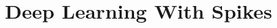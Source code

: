 \documentclass[main]{subfiles}
\begin{document}
\newpage
\section{Deep Learning With Spikes}
\end{document}
